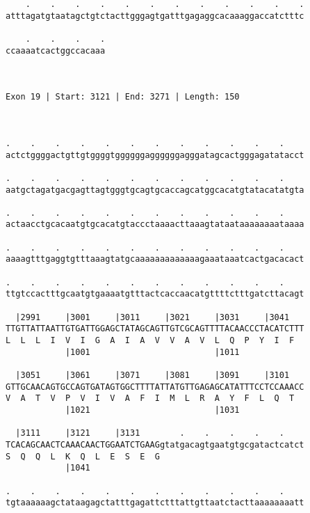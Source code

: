 \documentclass{article}
\begin{document}
\begin{Verbatim}
    .    .    .    .    .    .    .    .    .    .    .    .
atttagatgtaatagctgtctacttgggagtgatttgagaggcacaaaggaccatctttc
                                                            
    .    .    .    .
ccaaaatcactggccacaaa
                    
                    
 
Exon 19 | Start: 3121 | End: 3271 | Length: 150



.    .    .    .    .    .    .    .    .    .    .    .    
actctggggactgttgtggggtggggggaggggggagggatagcactgggagatatacct
                                                            
.    .    .    .    .    .    .    .    .    .    .    .    
aatgctagatgacgagttagtgggtgcagtgcaccagcatggcacatgtatacatatgta
                                                            
.    .    .    .    .    .    .    .    .    .    .    .    
actaacctgcacaatgtgcacatgtaccctaaaacttaaagtataataaaaaaaataaaa
                                                            
.    .    .    .    .    .    .    .    .    .    .    .    
aaaagtttgaggtgtttaaagtatgcaaaaaaaaaaaaagaaataaatcactgacacact
                                                            
.    .    .    .    .    .    .    .    .    .    .    .    
ttgtccactttgcaatgtgaaaatgtttactcaccaacatgttttctttgatcttacagt
                                                            
  |2991     |3001     |3011     |3021     |3031     |3041   
TTGTTATTAATTGTGATTGGAGCTATAGCAGTTGTCGCAGTTTTACAACCCTACATCTTT
L  L  L  I  V  I  G  A  I  A  V  V  A  V  L  Q  P  Y  I  F  
            |1001                         |1011             
  
  |3051     |3061     |3071     |3081     |3091     |3101   
GTTGCAACAGTGCCAGTGATAGTGGCTTTTATTATGTTGAGAGCATATTTCCTCCAAACC
V  A  T  V  P  V  I  V  A  F  I  M  L  R  A  Y  F  L  Q  T  
            |1021                         |1031             
  
  |3111     |3121     |3131        .    .    .    .    .    
TCACAGCAACTCAAACAACTGGAATCTGAAGgtatgacagtgaatgtgcgatactcatct
S  Q  Q  L  K  Q  L  E  S  E  G                             
            |1041                                           
  
.    .    .    .    .    .    .    .    .    .    .    .    
tgtaaaaaagctataagagctatttgagattctttattgttaatctacttaaaaaaaatt
                                                            

\end{Verbatim}
\end{document}
